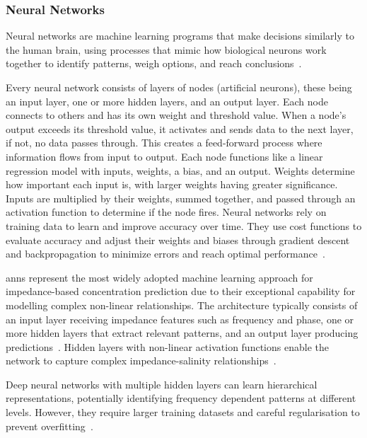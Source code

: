 \subsubsection{Neural Networks}
Neural networks are machine learning programs that make decisions similarly to the human brain, using processes that mimic how biological neurons work together to identify patterns, weigh options, and reach conclusions~\cite{ibm_nn}.

Every neural network consists of layers of nodes (artificial neurons), these being an input layer, one or more hidden layers, and an output layer. Each node connects to others and has its own weight and threshold value.
When a node's output exceeds its threshold value, it activates and sends data to the next layer, if not, no data passes through.
This creates a feed-forward process where information flows from input to output. Each node functions like a linear regression model with inputs, weights, a bias, and an output.
Weights determine how important each input is, with larger weights having greater significance. Inputs are multiplied by their weights, summed together, and passed through an activation function to determine if the node fires.
Neural networks rely on training data to learn and improve accuracy over time.
They use cost functions to evaluate accuracy and adjust their weights and biases through gradient descent and backpropagation to minimize errors and reach optimal performance~\cite{ibm_nn}.

\glspl{ann} represent the most widely adopted machine learning approach for impedance-based concentration prediction due to their exceptional capability for modelling complex non-linear relationships.
The architecture typically consists of an input layer receiving impedance features such as frequency and phase, one or more hidden layers that extract relevant patterns, and an output layer producing predictions~\cite{christopher_m_bishop_pattern_2006}.
Hidden layers with non-linear activation functions enable the network to capture complex impedance-salinity relationships~\cite{ann_eis_hsueh}.

Deep neural networks with multiple hidden layers can learn hierarchical representations, potentially identifying frequency dependent patterns at different levels.
However, they require larger training datasets and careful regularisation to prevent overfitting~\cite{ann_eis_hsueh}.

